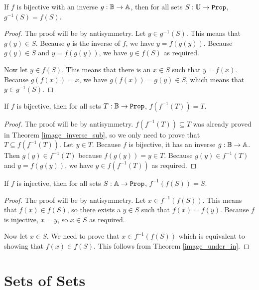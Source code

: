 \documentclass[../../math.tex]{subfiles}
\begin{document}
\begin{theorem} \label{inverse_image_bij_inv}
    If $f$ is bijective with an inverse $g : \mathbb{B} \rightarrow \mathbb{A}$, then for all
    sets $S : \U \rightarrow \Prop$, $g^{-1}(S) = f(S)$.
\end{theorem}
\begin{proof}
    The proof will be by antisymmetry.  Let $y \in g^{-1}(S)$.  This means that
    $g(y) \in S$.  Because $g$ is the inverse of $f$, we have $y = f(g(y))$.
    Because $g(y) \in S$ and $y = f(g(y))$, we have $y \in f(S)$ as required.

    Now let $y \in f(S)$.  This means that there is an $x \in S$ such that $y =
    f(x)$.  Because $g(f(x)) = x$, we have $g(f(x)) = g(y) \in S$, which means
    that $y \in g^{-1}(S)$.
\end{proof}

\begin{theorem} \label{bij_inverse_image}
    If $f$ is bijective, then for all sets $T : \B \rightarrow \Prop$,
    $f(f^{-1}(T)) = T$.
\end{theorem}
\begin{proof}
    The proof will be by antisymmetry.  $f(f^{-1}(T)) \subseteq T$ was already
    proved in Theorem \ref{image_inverse_sub}, so we only need to prove that
    $T \subseteq f(f^{-1}(T))$.  Let $y \in T$.  Because $f$ is bijective, it
    has an inverse $g : \mathbb{B} \rightarrow \mathbb{A}$.  Then $g(y) \in f^{-1}(T)$ because
    $f(g(y)) = y \in T$.  Because $g(y) \in f^{-1}(T)$ and $y = f(g(y))$, we
    have $y \in f(f^{-1}(T))$ as required.
\end{proof}

\begin{theorem} \label{inj_inverse_image}
    If $f$ is injective, then for all sets $S : \A \rightarrow \Prop$,
    $f^{-1}(f(S)) = S$.
\end{theorem}
\begin{proof}
    The proof will be by antisymmetry.  Let $x \in f^{-1}(f(S))$.  This means
    that $f(x) \in f(S)$, so there exists a $y \in S$ such that $f(x) = f(y)$.
    Because $f$ is injective, $x = y$, so $x \in S$ as required.

    Now let $x \in S$.  We need to prove that $x \in f^{-1}(f(S))$ which is
    equivalent to showing that $f(x) \in f(S)$.  This follows from Theorem
    \ref{image_under_in}.
\end{proof}

\section{Sets of Sets}
\end{document}

